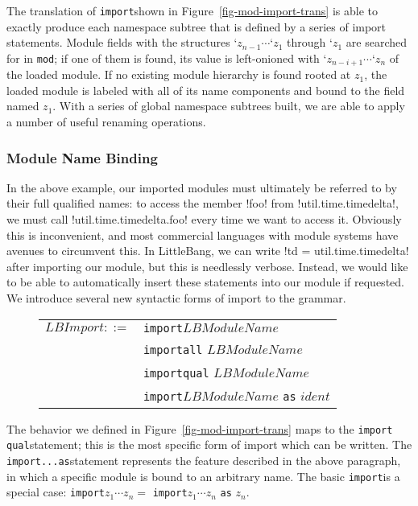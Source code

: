 \documentclass{article}
\newcommand{\lbimport}{\texttt{import}\;}
\newcommand{\lbimportq}{\texttt{import qual}\;}
\newcommand{\lbimporta}{\texttt{import...as}\;}
\begin{document}
\indent The translation of \lbimport shown in Figure~\ref{fig-mod-import-trans} is able to exactly produce each namespace subtree that is defined by a series of import statements. Module fields with the structures $\texttt{`}z_{n-1} \cdots \texttt{`} z_1$ through $\texttt{`} z_1$ are searched for in \texttt{mod}; if one of them is found, its value is left-onioned with $\texttt{`}z_{n-i+1} \cdots \texttt{`}z_n$ of the loaded module. If no existing module hierarchy is found rooted at $z_1$, the loaded module is labeled with all of its name components and bound to the field named $z_1$. With a series of global namespace subtrees built, we are able to apply a number of useful renaming operations.
\subsubsection{Module Name Binding}
\label{sss-mod-name-binding}
In the above example, our imported modules must ultimately be referred to by their full qualified names: to access the member \lbil!foo! from \lbil!util.time.timedelta!, we must call \lbil!util.time.timedelta.foo! every time we want to access it. Obviously this is inconvenient, and most commercial languages with module systems have avenues to circumvent this. In LittleBang, we can write \lbil!td = util.time.timedelta! after importing our module, but this is needlessly verbose. Instead, we would like to be able to automatically insert these statements into our module if requested. We introduce several new syntactic forms of import to the grammar.\\
\begin{figure}[h]
\begin{tabular}{l l @{ $|$}}
	$LBImport ::= $ & \lbimport $LBModuleName$\\
	& \lbimport \texttt{all} $LBModuleName$\\
	& \lbimport \texttt{qual} $LBModuleName$\\
	& \lbimport $LBModuleName$ \texttt{as} $ident$\\
\end{tabular}
\end{figure}
The behavior we defined in Figure~\ref{fig-mod-import-trans} maps to the \lbimportq statement; this is the most specific form of import which can be written. The \lbimporta statement represents the feature described in the above paragraph, in which a specific module is bound to an arbitrary name. The basic \lbimport is a special case: \lbimport $z_1\cdots z_n = $ \lbimport $z_1\cdots z_n$ \texttt{as} $z_n$.
\end{document}
